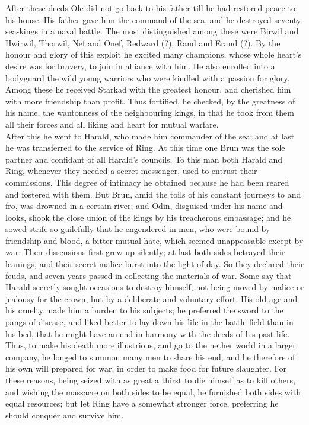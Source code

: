 \documentclass[10pt,a4paper]{report}
\begin{document}
After these deeds Ole did not go back to his father till he had restored peace to his house. His father gave him the command of the sea, and he destroyed seventy sea-kings in a naval battle. The most distinguished among these were Birwil and Hwirwil, Thorwil, Nef and Onef, Redward (?), Rand and Erand (?). By the honour and glory of this exploit he excited many champions, whose whole heart's desire was for bravery, to join in alliance with him. He also enrolled into a bodyguard the wild young warriors who were kindled with a passion for glory. Among these he received Starkad with the greatest honour, and cherished him with more friendship than profit. Thus fortified, he checked, by the greatness of his name, the wantonness of the neighbouring kings, in that he took from them all their forces and all liking and heart for mutual warfare.\\

After this he went to Harald, who made him commander of the sea; and at last he was transferred to the service of Ring. At this time one Brun was the sole partner and confidant of all Harald's councils. To this man both Harald and Ring, whenever they needed a secret messenger, used to entrust their commissions. This degree of intimacy he obtained because he had been reared and fostered with them. But Brun, amid the toils of his constant journeys to and fro, was drowned in a certain river; and Odin, disguised under his name and looks, shook the close union of the kings by his treacherous embassage; and he sowed strife so guilefully that he engendered in men, who were bound by friendship and blood, a bitter mutual hate, which seemed unappeasable except by war. Their dissensions first grew up silently; at last both sides betrayed their leanings, and their secret malice burst into the light of day. So they declared their feuds, and seven years passed in collecting the materials of war. Some say that Harald secretly sought occasions to destroy himself, not being moved by malice or jealousy for the crown, but by a deliberate and voluntary effort. His old age and his cruelty made him a burden to his subjects; he preferred the sword to the pangs of disease, and liked better to lay down his life in the battle-field than in his bed, that he might have an end in harmony with the deeds of his past life. Thus, to make his death more illustrious, and go to the nether world in a larger company, he longed to summon many men to share his end; and he therefore of his own will prepared for war, in order to make food for future slaughter. For these reasons, being seized with as great a thirst to die himself as to kill others, and wishing the massacre on both sides to be equal, he furnished both sides with equal resources; but let Ring have a somewhat stronger force, preferring he should conquer and survive him.\\
\end{document}
